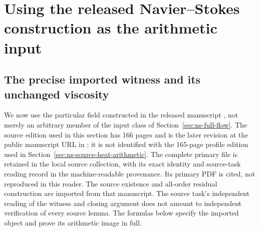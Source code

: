 \section{Using the released Navier--Stokes construction as the arithmetic input}
\label{sec:ns-actual-witness}

\subsection{The precise imported witness and its unchanged viscosity}

We now use the particular field constructed in the released manuscript
\cite{openaiNS2026release}, not merely an arbitrary member of the input class
of Section~\ref{sec:ns-full-flow}. The source edition used in this section has 166 pages and is the
later revision at the public manuscript URL in
\cite{openaiNS2026release}; it is not identified with the 165-page
profile edition used in Section~\ref{sec:ns-source-heat-arithmetic}.
The complete primary file is retained in the local source collection,
with its exact identity and source-task reading record in the
machine-readable provenance. Its primary PDF is cited, not reproduced
in this reader. The source existence and all-order residual
construction are imported from that manuscript. The source task's
independent reading of the witness and closing argument does not
amount to independent verification of every source lemma.
The formulas below specify the imported object and prove its arithmetic
image in full.

